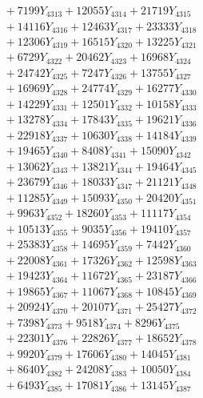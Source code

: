 \documentclass[a4paper,10pt]{article}
\begin{document}
{\begin{align}
&\;  + 7199 Y_{4313} + 12055 Y_{4314} + 21719 Y_{4315} \\[0.3ex]
&\;  + 14116 Y_{4316} + 12463 Y_{4317} + 23333 Y_{4318} \\[0.5ex]\allowbreak
&\;  + 12306 Y_{4319} + 16515 Y_{4320} + 13225 Y_{4321} \\[0.3ex]
&\;  + 6729 Y_{4322} + 20462 Y_{4323} + 16968 Y_{4324} \\[0.3ex]
&\;  + 24742 Y_{4325} + 7247 Y_{4326} + 13755 Y_{4327} \\[0.3ex]
&\;  + 16969 Y_{4328} + 24774 Y_{4329} + 16277 Y_{4330} \\[0.3ex]
&\;  + 14229 Y_{4331} + 12501 Y_{4332} + 10158 Y_{4333} \\[0.3ex]
&\;  + 13278 Y_{4334} + 17843 Y_{4335} + 19621 Y_{4336} \\[0.3ex]
&\;  + 22918 Y_{4337} + 10630 Y_{4338} + 14184 Y_{4339} \\[0.3ex]
&\;  + 19465 Y_{4340} + 8408 Y_{4341} + 15090 Y_{4342} \\[0.3ex]
&\;  + 13062 Y_{4343} + 13821 Y_{4344} + 19464 Y_{4345} \\[0.3ex]
&\;  + 23679 Y_{4346} + 18033 Y_{4347} + 21121 Y_{4348} \\[0.5ex]\allowbreak
&\;  + 11285 Y_{4349} + 15093 Y_{4350} + 20420 Y_{4351} \\[0.3ex]
&\;  + 9963 Y_{4352} + 18260 Y_{4353} + 11117 Y_{4354} \\[0.3ex]
&\;  + 10513 Y_{4355} + 9035 Y_{4356} + 19410 Y_{4357} \\[0.3ex]
&\;  + 25383 Y_{4358} + 14695 Y_{4359} + 7442 Y_{4360} \\[0.3ex]
&\;  + 22008 Y_{4361} + 17326 Y_{4362} + 12598 Y_{4363} \\[0.3ex]
&\;  + 19423 Y_{4364} + 11672 Y_{4365} + 23187 Y_{4366} \\[0.3ex]
&\;  + 19865 Y_{4367} + 11067 Y_{4368} + 10845 Y_{4369} \\[0.3ex]
&\;  + 20924 Y_{4370} + 20107 Y_{4371} + 25427 Y_{4372} \\[0.3ex]
&\;  + 7398 Y_{4373} + 9518 Y_{4374} + 8296 Y_{4375} \\[0.3ex]
&\;  + 22301 Y_{4376} + 22826 Y_{4377} + 18652 Y_{4378} \\[0.5ex]\allowbreak
&\;  + 9920 Y_{4379} + 17606 Y_{4380} + 14045 Y_{4381} \\[0.3ex]
&\;  + 8640 Y_{4382} + 24208 Y_{4383} + 10050 Y_{4384} \\[0.3ex]
&\;  + 6493 Y_{4385} + 17081 Y_{4386} + 13145 Y_{4387} \\[0.3ex]

\end{align}}
\end{document}
